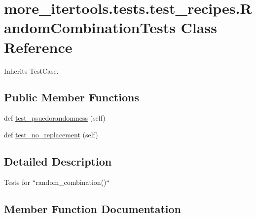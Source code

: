 \hypertarget{classmore__itertools_1_1tests_1_1test__recipes_1_1_random_combination_tests}{}\section{more\+\_\+itertools.\+tests.\+test\+\_\+recipes.\+Random\+Combination\+Tests Class Reference}
\label{classmore__itertools_1_1tests_1_1test__recipes_1_1_random_combination_tests}


Inherits Test\+Case.

\subsection*{Public Member Functions}
\begin{DoxyCompactItemize}
\item 
def \hyperlink{classmore__itertools_1_1tests_1_1test__recipes_1_1_random_combination_tests_a461d9e78c1cc6f56fc21ae8e7223572d}{test\+\_\+psuedorandomness} (self)
\item 
def \hyperlink{classmore__itertools_1_1tests_1_1test__recipes_1_1_random_combination_tests_ada27653d6d039bb4f6bf3d385d11452d}{test\+\_\+no\+\_\+replacement} (self)
\end{DoxyCompactItemize}


\subsection{Detailed Description}
\begin{DoxyVerb}Tests for ``random_combination()``\end{DoxyVerb}
 

\subsection{Member Function Documentation}
\mbox{\label{classmore__itertools_1_1tests_1_1test__recipes_1_1_random_combination_tests_ada27653d6d039bb4f6bf3d385d11452d}} 
